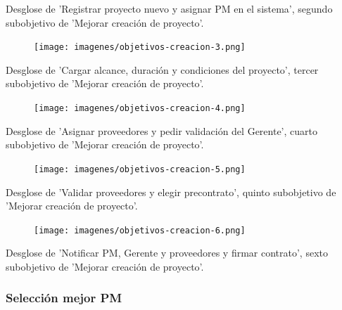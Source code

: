 Desglose de 'Registrar proyecto nuevo y asignar PM en el sistema', segundo subobjetivo de 'Mejorar creación de proyecto'.

\vspace{1em}

\begin{figure}[H]
	\hspace{-2cm}
    \texttt{[image: imagenes/objetivos-creacion-3.png]}
\end{figure}

Desglose de 'Cargar alcance, duración y condiciones del proyecto', tercer subobjetivo de 'Mejorar creación de proyecto'.

\vspace{1em}

\begin{figure}[H]
    \centering
    \texttt{[image: imagenes/objetivos-creacion-4.png]}
\end{figure}

Desglose de 'Asignar proveedores y pedir validación del Gerente', cuarto subobjetivo de 'Mejorar creación de proyecto'.

\vspace{1em}

\begin{figure}[H]
    \centering
    \texttt{[image: imagenes/objetivos-creacion-5.png]}
\end{figure}

Desglose de 'Validar proveedores y elegir precontrato', quinto subobjetivo de 'Mejorar creación de proyecto'.

\vspace{1em}

\begin{figure}[H]
    \centering
    \texttt{[image: imagenes/objetivos-creacion-6.png]}
\end{figure}

Desglose de 'Notificar PM, Gerente y proveedores y firmar contrato', sexto subobjetivo de 'Mejorar creación de proyecto'.

\newpage

\subsubsection{Selección mejor PM}

